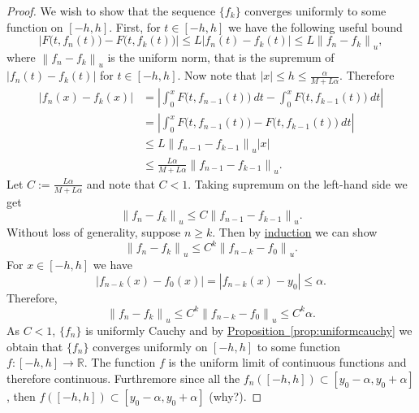 \documentclass[12pt]{book}
\newcommand{\abs}[1]{\left\lvert {#1} \right\rvert}
\newcommand{\norm}[1]{\left\lVert {#1} \right\rVert}
\newcommand{\R}{{\mathbb{R}}}
\theoremstyle{plain}
\theoremstyle{remark}
\theoremstyle{definition}
\theoremstyle{exercise}
\theoremstyle{example}
\newcommand{\propref}[1]{\hyperref[#1]{Proposition~\ref*{#1}}}
\begin{document}
\begin{proof}
We wish to show that the sequence $\{ f_k \}$ converges uniformly
to some function on $[-h,h]$.  First, for $t \in [-h,h]$
we have the following
useful bound
\begin{equation*}
\abs{F\bigl(t,f_{n}(t)\bigr) - 
F\bigl(t,f_{k}(t)\bigr)}
\leq
L \abs{f_n(t)-f_k(t)}
\leq
L \norm{f_n-f_k}_u ,
\end{equation*}
where $\norm{f_n-f_k}_u$ is the uniform norm, that
is the supremum of $\abs{f_n(t)-f_k(t)}$ for $t \in [-h,h]$.
Now note that $\abs{x} \leq h \leq \frac{\alpha}{M+L\alpha}$.
Therefore
\begin{equation*}
\begin{split}
\abs{f_n(x) - f_k(x)}
& =
\abs{\int_{0}^x F\bigl(t,f_{n-1}(t)\bigr)~dt 
-
\int_{0}^x F\bigl(t,f_{k-1}(t)\bigr)~dt}
\\
& =
\abs{\int_{0}^x F\bigl(t,f_{n-1}(t)\bigr)-
F\bigl(t,f_{k-1}(t)\bigr)~dt}
\\
& \leq
L\norm{f_{n-1}-f_{k-1}}_u
\abs{x}
\\
& \leq
\frac{L\alpha}{M+L\alpha}
\norm{f_{n-1}-f_{k-1}}_u .
\end{split}
\end{equation*}
Let $C := \frac{L\alpha}{M+L\alpha}$ and note that $C < 1$.
Taking supremum on the left-hand side we get
\begin{equation*}
\norm{f_n-f_k}_u \leq C \norm{f_{n-1}-f_{k-1}}_u .
\end{equation*}
Without loss of generality,
suppose $n \geq k$.  Then by \hyperref[induction:thm]{induction} we can show 
\begin{equation*}
\norm{f_n-f_k}_u \leq C^{k} \norm{f_{n-k}-f_{0}}_u .
\end{equation*}
For $x \in [-h,h]$ we have
\begin{equation*}
\abs{f_{n-k}(x)-f_{0}(x)}
=
\abs{f_{n-k}(x)-y_0}
\leq \alpha .
\end{equation*}
Therefore,
\begin{equation*}
\norm{f_n-f_k}_u \leq C^{k} \norm{f_{n-k}-f_{0}}_u \leq C^{k} \alpha .
\end{equation*}
As $C < 1$, $\{f_n\}$ is uniformly Cauchy and by
\propref{prop:uniformcauchy} we obtain that $\{ f_n \}$
converges uniformly on $[-h,h]$ to some function $f \colon [-h,h] \to \R$.
The function $f$ is the uniform limit of continuous functions and therefore
continuous.  Furthremore since all the $f_n([-h,h]) \subset
[y_0-\alpha,y_0+\alpha]$, then $f([-h,h]) \subset [y_0-\alpha,y_0+\alpha]$
(why?).



\end{proof}
\end{document}
